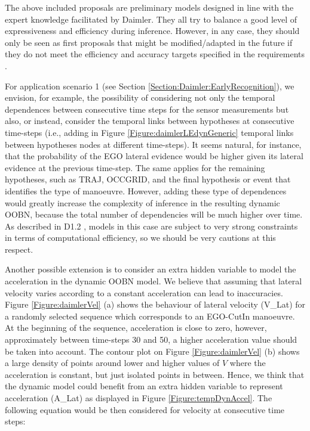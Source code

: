 The above included proposals are preliminary models designed in line with the expert knowledge facilitated by Daimler. They all try to balance a good level of expressiveness and efficiency during inference. However, in any case, they should only be seen as first proposals that might be modified/adapted in the future if they do not meet the efficiency and accuracy targets specified in the requirements \cite{Fer14}. 

For application scenario 1 (see Section \ref{Section:Daimler:EarlyRecognition}), we envision, for example, the possibility of considering not only the temporal dependences between consecutive time steps for the sensor measurements but also, or instead, consider the temporal links between hypotheses at consecutive time-steps (i.e., adding in Figure \ref{Figure:daimlerLEdynGeneric} temporal links between hypotheses nodes at different time-steps). It seems natural, for instance, that the probability of the EGO lateral evidence would be higher given its lateral evidence at the previous time-step. The same applies for the remaining hypotheses, such as TRAJ, OCCGRID, and the final hypothesis or event that identifies the type of manoeuvre. However, adding these type of dependences would greatly increase the complexity of inference in the resulting dynamic OOBN, because the total number of dependencies will be much higher over time. As described in D1.2 \cite{Fer14}, models in this case are subject to very strong constraints in terms of computational efficiency, so we should be very cautions at this respect. 

Another possible extension is to consider an extra hidden variable to model the acceleration in the dynamic OOBN model. We believe that assuming that lateral velocity varies according to a constant acceleration can lead to inaccuracies. Figure \ref{Figure:daimlerVel} (a) shows the behaviour of lateral velocity (V\_Lat) for a randomly selected sequence which corresponds to an EGO-CutIn manoeuvre. At the beginning of the sequence, acceleration is close to zero, however, approximately between time-steps 30 and 50, a higher acceleration value should be taken into account. The contour plot on Figure \ref{Figure:daimlerVel} (b) shows a large density of points around lower and higher values of $V$ where the acceleration is constant, but just isolated points in between. Hence, we think that the dynamic model could benefit from an extra hidden variable to represent acceleration (A\_Lat) as displayed in Figure \ref{Figure:tempDynAccel}. The following equation would be then considered for velocity at consecutive time steps: %

